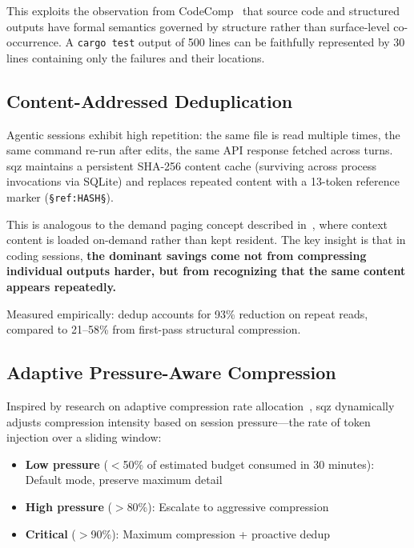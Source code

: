 \documentclass[10pt,twocolumn]{article}
\begin{document}
This exploits the observation from CodeComp~\cite{chen2025codecomp} that source code and structured outputs have formal semantics governed by structure rather than surface-level co-occurrence. A \texttt{cargo test} output of 500 lines can be faithfully represented by 30 lines containing only the failures and their locations.

\subsection{Content-Addressed Deduplication}

Agentic sessions exhibit high repetition: the same file is read multiple times, the same command re-run after edits, the same API response fetched across turns. sqz maintains a persistent SHA-256 content cache (surviving across process invocations via SQLite) and replaces repeated content with a 13-token reference marker (\texttt{\S ref:HASH\S}).

This is analogous to the demand paging concept described in~\cite{demandpaging2025}, where context content is loaded on-demand rather than kept resident. The key insight is that in coding sessions, \textbf{the dominant savings come not from compressing individual outputs harder, but from recognizing that the same content appears repeatedly.}

Measured empirically: dedup accounts for 93\% reduction on repeat reads, compared to 21--58\% from first-pass structural compression.

\subsection{Adaptive Pressure-Aware Compression}

Inspired by research on adaptive compression rate allocation~\cite{adaptive2025,accrag2025}, sqz dynamically adjusts compression intensity based on session pressure---the rate of token injection over a sliding window:

\begin{itemize}
  \item \textbf{Low pressure} ($<$50\% of estimated budget consumed in 30 minutes): Default mode, preserve maximum detail
  \item \textbf{High pressure} ($>$80\%): Escalate to aggressive compression
  \item \textbf{Critical} ($>$90\%): Maximum compression + proactive dedup
\end{itemize}
\end{document}
